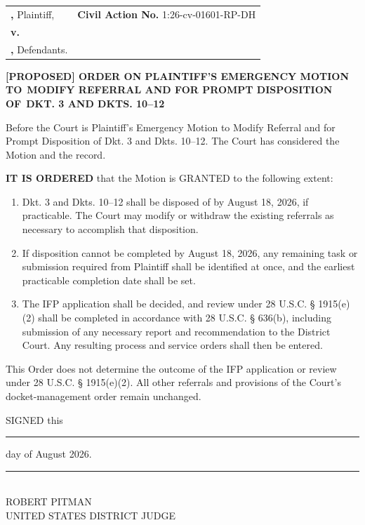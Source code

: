 \documentclass[12pt]{article}
\makeatletter
\renewcommand{\FilingCivilActionNumber}{1:26-cv-01601-RP-DH}
\newcommand{\Caption}{%
  \begin{singlespace}
  \begin{center}
  \textbf{\FilingCourtName}\\
  \textbf{\FilingDistrictName}\\
  \textbf{\FilingDivisionName}
  \end{center}

  \vspace{0.45em}

  \noindent
  \begin{tabularx}{\textwidth}{@{}>{\raggedright\arraybackslash}X>{\raggedright\arraybackslash}p{2.95in}@{}}
  \textbf{\FilingPlaintiffNameUpper,} Plaintiff, & \textbf{Civil Action No.} \FilingCivilActionNumber \\
  \textbf{v.} & \\
  \textbf{\FilingDefendantsInlineUpper,} Defendants. & \\
  \end{tabularx}

  \vspace{1.0em}
  \end{singlespace}%
}
\makeatother
\begin{document}
\Caption

\begin{singlespace}
\begin{center}
\textbf{[PROPOSED] ORDER ON PLAINTIFF'S EMERGENCY MOTION TO}\
\textbf{MODIFY REFERRAL AND FOR PROMPT DISPOSITION OF}\
\textbf{DKT. 3 AND DKTS. 10--12}
\end{center}
\end{singlespace}

Before the Court is Plaintiff's Emergency Motion to Modify Referral and for Prompt Disposition of Dkt. 3 and Dkts. 10--12. The Court has considered the Motion and the record.

\textbf{IT IS ORDERED} that the Motion is GRANTED to the following extent:

\begin{enumerate}
\item Dkt. 3 and Dkts. 10--12 shall be disposed of by August 18, 2026, if practicable. The Court may modify or withdraw the existing referrals as necessary to accomplish that disposition.

\item If disposition cannot be completed by August 18, 2026, any remaining task or submission required from Plaintiff shall be identified at once, and the earliest practicable completion date shall be set.

\item The IFP application shall be decided, and review under 28 U.S.C. § 1915(e)(2) shall be completed in accordance with 28 U.S.C. § 636(b), including submission of any necessary report and recommendation to the District Court. Any resulting process and service orders shall then be entered.
\end{enumerate}

This Order does not determine the outcome of the IFP application or review under 28 U.S.C. § 1915(e)(2). All other referrals and provisions of the Court's docket-management order remain unchanged.

\vspace{1.0em}
SIGNED this \rule{1.4in}{0.4pt} day of August 2026.

\vspace{0.5em}
\noindent\rule{3.5in}{0.4pt}\\
ROBERT PITMAN\\
UNITED STATES DISTRICT JUDGE
\end{document}
